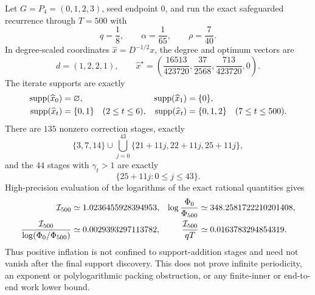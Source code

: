 \begin{proposition}
\label{prop:aesp-cd-p4-late-inflation}
Let $G=P_4=(0,1,2,3)$, seed endpoint $0$, and run the exact safeguarded
recurrence through $T=500$ with
\begin{equation}
 q=\frac18,\qquad \alpha=\frac1{65},\qquad
 \rho=\frac7{40}.
 \label{eq:aesp-cd-p4-parameters}
\end{equation}
In degree-scaled coordinates $\widehat x=D^{-1/2}x$, the degree and optimum
vectors are
\begin{equation}
 d=(1,2,2,1),\qquad
 \widehat x^\star=\left(
 \frac{16513}{423720},\frac{37}{2568},
 \frac{713}{423720},0\right).
 \label{eq:aesp-cd-p4-vectors}
\end{equation}
The iterate supports are exactly
\begin{equation}
 \begin{aligned}
 \operatorname{supp}(\widehat x_0)&=\varnothing,
 &\operatorname{supp}(\widehat x_1)&=\{0\},\\
 \operatorname{supp}(\widehat x_t)&=\{0,1\}\quad(2\leq t\leq6),
 &\operatorname{supp}(\widehat x_t)&=\{0,1,2\}\quad(7\leq t\leq500).
 \end{aligned}
 \label{eq:aesp-cd-p4-support-schedule}
\end{equation}
There are $135$ nonzero correction stages, exactly
\begin{equation}
 \{3,7,14\}\cup
 \bigcup_{j=0}^{43}\{21+11j,22+11j,25+11j\},
 \label{eq:aesp-cd-p4-correction-schedule}
\end{equation}
and the $44$ stages with $\gamma_t>1$ are exactly
\begin{equation}
 \{25+11j:0\leq j\leq43\}.
 \label{eq:aesp-cd-p4-positive-schedule}
\end{equation}
High-precision evaluation of the logarithms of the exact rational quantities
gives
\begin{align}
 \mathcal I_{500}&\simeq1.0236455928394953,
 &\log\frac{\Phi_0}{\Phi_{500}}
 &\simeq348.2581722210201408,\notag\\
 \frac{\mathcal I_{500}}{\log(\Phi_0/\Phi_{500})}
 &\simeq0.0029393297113782,
 &\frac{\mathcal I_{500}}{qT}
 &\simeq0.0163783294854319.
 \label{eq:aesp-cd-p4-metrics}
\end{align}
Thus positive inflation is not confined to support-addition stages and need
not vanish after the final support discovery.  This does not prove infinite
periodicity, an exponent or polylogarithmic packing obstruction, or any
finite-inner or end-to-end work lower bound.
\end{proposition}

